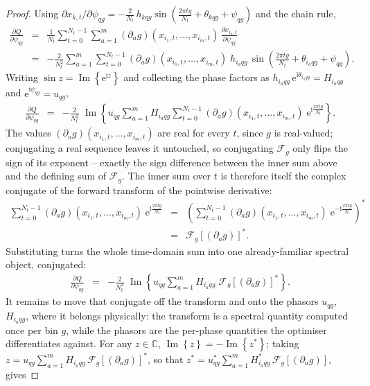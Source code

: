 \documentclass[10pt,a4paper]{article}
\numberwithin{equation}{section}
\newcommand{\block}[1]{\left[#1\right]}
\newcommand{\mat}[1]{\left(#1\right)}
\newcommand{\im}[1]{\operatorname{Im}\left\{#1\right\}}
\newcommand{\m}[1]{\mathrm{#1}}
\begin{document}
\begin{proof}
Using $\partial x_{k,t}/\partial \psi_{q g} = -\frac{2}{N_t}\, h_{k q g}\sin\mat{\frac{2 \pi t g}{N_t} + \theta_{k q g} + \psi_{q g}}$ and the chain rule,
\begin{eqnarray}
\frac{\partial Q}{\partial \psi_{q g}}
	&=& \frac{1}{N_t}\sum_{t=0}^{N_t-1}\sum_{a=1}^{m}\mat{\partial_a g}\mat{x_{i_1,t},\ldots,x_{i_m,t}}\,\frac{\partial x_{i_a,t}}{\partial \psi_{q g}} \\
	&=& -\frac{2}{N_t^2}\sum_{a=1}^{m}\sum_{t=0}^{N_t-1}\mat{\partial_a g}\mat{x_{i_1,t},\ldots,x_{i_m,t}}\; h_{i_a q g}\,\sin\mat{\frac{2 \pi t g}{N_t} + \theta_{i_a q g} + \psi_{q g}}.
\end{eqnarray}
Writing $\sin z = \im{\m{e}^{\m{i} z}}$ and collecting the phase factors as $h_{i_a q g}\,\m{e}^{\m{i}\theta_{i_a q g}} = H_{i_a q g}$ and $\m{e}^{\m{i}\psi_{q g}} = u_{q g}$,
\begin{eqnarray}
\frac{\partial Q}{\partial \psi_{q g}}
	&=& -\frac{2}{N_t^2}\;\im{u_{q g} \sum_{a=1}^{m} H_{i_a q g} \sum_{t=0}^{N_t-1}\mat{\partial_a g}\mat{x_{i_1,t},\ldots,x_{i_m,t}}\;\m{e}^{\m{i}\frac{2 \pi t g}{N_t}}}.
\end{eqnarray}
The values $\mat{\partial_a g}\mat{x_{i_1,t},\ldots,x_{i_m,t}}$ are real for every $t$, since $g$ is real-valued; conjugating a real sequence leaves it untouched, so conjugating $\mathcal{F}_g$ only flips the sign of its exponent -- exactly the sign difference between the inner sum above and the defining sum of $\mathcal{F}_g$. The inner sum over $t$ is therefore itself the complex conjugate of the forward transform of the pointwise derivative:
\begin{eqnarray}
\sum_{t=0}^{N_t-1}\mat{\partial_a g}\mat{x_{i_1,t},\ldots,x_{i_m,t}}\;\m{e}^{\m{i}\frac{2 \pi t g}{N_t}}
	&=& \mat{\sum_{t=0}^{N_t-1}\mat{\partial_a g}\mat{x_{i_1,t},\ldots,x_{i_m,t}}\;\m{e}^{-\m{i}\frac{2 \pi t g}{N_t}}}^{*} \\
	&=& \mathcal{F}_g\block{\mat{\partial_a g}}^{*}.
\end{eqnarray}
Substituting turns the whole time-domain sum into one already-familiar spectral object, conjugated:
\begin{eqnarray}
\frac{\partial Q}{\partial \psi_{q g}}
	&=& -\frac{2}{N_t^2}\;\im{u_{q g} \sum_{a=1}^{m} H_{i_a q g}\;\mathcal{F}_g\block{\mat{\partial_a g}}^{*}}.
\end{eqnarray}
It remains to move that conjugate off the transform and onto the phasors $u_{qg}$, $H_{i_a qg}$, where it belongs physically: the transform is a spectral quantity computed once per bin $g$, while the phasors are the per-phase quantities the optimiser differentiates against. For any $z\in\mathbb{C}$, $\im{z}=-\im{z^*}$; taking $z = u_{q g}\sum_{a=1}^{m} H_{i_a qg}\,\mathcal{F}_g\block{\mat{\partial_a g}}^{*}$, so that $z^{*} = u_{q g}^{*}\sum_{a=1}^{m} H_{i_a qg}^{*}\,\mathcal{F}_g\block{\mat{\partial_a g}}$, gives

\end{proof}
\end{document}
